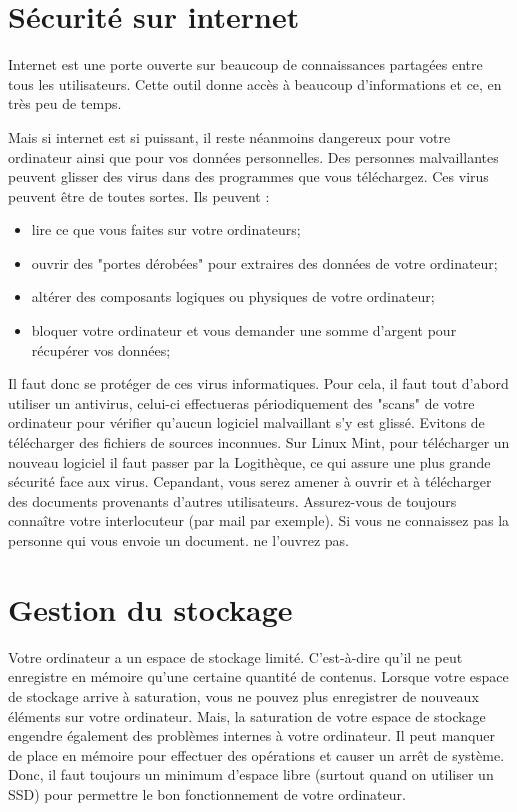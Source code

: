 \documentclass[12pt]{book}
\begin{document}
	\section{Sécurité sur internet}
		Internet est une porte ouverte sur beaucoup de connaissances partagées entre tous les utilisateurs.
		Cette outil donne accès à beaucoup d'informations et ce, en très peu de temps.\par
		Mais si internet est si puissant, il reste néanmoins dangereux pour votre ordinateur ainsi que pour vos données personnelles.
		Des personnes malvaillantes peuvent glisser des virus dans des programmes que vous téléchargez.
		Ces virus peuvent être de toutes sortes. Ils peuvent :
		\begin{itemize}
			\item lire ce que vous faites sur votre ordinateurs; 
			\item ouvrir des "portes dérobées" pour extraires des données de votre ordinateur;
			\item altérer des composants logiques ou physiques de votre ordinateur;
			\item bloquer votre ordinateur et vous demander une somme d'argent pour récupérer vos données;
		\end{itemize}
		Il faut donc se protéger de ces virus informatiques.
		Pour cela, il faut tout d'abord utiliser un antivirus, celui-ci effectueras périodiquement des "scans" de votre ordinateur pour vérifier qu'aucun logiciel malvaillant s'y est glissé.
		Evitons de télécharger des fichiers de sources inconnues.
		Sur Linux Mint, pour télécharger un nouveau logiciel il faut passer par la Logithèque, ce qui assure une plus grande sécurité face aux virus.
		Cepandant, vous serez amener à ouvrir et à télécharger des documents provenants d'autres utilisateurs.
		Assurez-vous de toujours connaître votre interlocuteur (par mail par exemple). 
		Si vous ne connaissez pas la personne qui vous envoie un document. ne l'ouvrez pas.
	\section{Gestion du stockage}
		Votre ordinateur a un espace de stockage limité.
		C'est-à-dire qu'il ne peut enregistre en mémoire qu'une certaine quantité de contenus.
		Lorsque votre espace de stockage arrive à saturation, vous ne pouvez plus enregistrer de nouveaux éléments sur votre ordinateur.
		Mais, la saturation de votre espace de stockage engendre également des problèmes internes à votre ordinateur.
		Il peut manquer de place en mémoire pour effectuer des opérations et causer un arrêt de système.
		Donc, il faut toujours un minimum d'espace libre (surtout quand on utiliser un SSD) pour permettre le bon fonctionnement de votre ordinateur.\par
\end{document}
